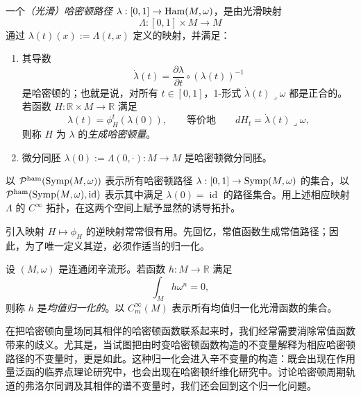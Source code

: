 \begin{definition}
\label{def:hamiltonian-path}
一个\emph{（光滑）哈密顿路径} $\lambda:[0,1]\to\operatorname{Ham}(M,\omega)$，是由光滑映射
\[
  \Lambda:[0,1]\times M\longrightarrow M
\]
通过 $\lambda(t)(x):=\Lambda(t,x)$ 定义的映射，并满足：
\begin{enumerate}[label=(\arabic*)]
  \item 其导数
  \[
    \dot\lambda(t)=\frac{\partial\lambda}{\partial t}
      \circ(\lambda(t))^{-1}
  \]
  是哈密顿的；也就是说，对所有 $t\in[0,1]$，1-形式
  $\dot\lambda(t)\mathbin{\lrcorner}\omega$ 都是正合的。若函数
  $H:\mathbb R\times M\to\mathbb R$ 满足
  \[
    \lambda(t)=\phi_H^t(\lambda(0)),
    \qquad\text{等价地}\qquad
    dH_t=\dot\lambda(t)\mathbin{\lrcorner}\omega,
  \]
  则称 $H$ 为 $\lambda$ 的\emph{生成哈密顿量}。
  \item 微分同胚
  $\lambda(0):=\Lambda(0,\mathord\cdot):M\to M$ 是哈密顿微分同胚。
\end{enumerate}
\end{definition}

以 $\mathcal P^{\mathrm{ham}}(\operatorname{Symp}(M,\omega))$ 表示所有哈密顿路径
$\lambda:[0,1]\to\operatorname{Symp}(M,\omega)$ 的集合，以
$\mathcal P^{\mathrm{ham}}(\operatorname{Symp}(M,\omega),\operatorname{id})$ 表示其中满足 $\lambda(0)=\operatorname{id}$ 的路径集合。用上述相应映射 $\Lambda$ 的 $C^\infty$ 拓扑，在这两个空间上赋予显然的诱导拓扑。

引入映射 $H\mapsto\phi_H$ 的逆映射常常很有用。先回忆，常值函数生成常值路径；因此，为了唯一定义其逆，必须作适当的归一化。

\begin{definition}
\label{def:mean-normalized}
设 $(M,\omega)$ 是连通闭辛流形。若函数 $h:M\to\mathbb R$ 满足
\begin{equation}
  \int_M h\omega^n=0,
  \label{eq:2.3.24}
\end{equation}
则称 $h$ 是\emph{均值归一化的}。以 $C_m^\infty(M)$ 表示所有均值归一化光滑函数的集合。
\end{definition}

\begin{remark}
\label{rem:normalization-hamiltonian}
在把哈密顿向量场同其相伴的哈密顿函数联系起来时，我们经常需要消除常值函数带来的歧义。尤其是，当试图把由时变哈密顿函数构造的不变量解释为相应哈密顿路径的不变量时，更是如此。这种归一化会进入辛不变量的构造：既会出现在作用量泛函的临界点理论研究中，也会出现在哈密顿纤维化研究中。讨论哈密顿周期轨道的弗洛尔同调及其相伴的谱不变量时，我们还会回到这个归一化问题。
\end{remark}

